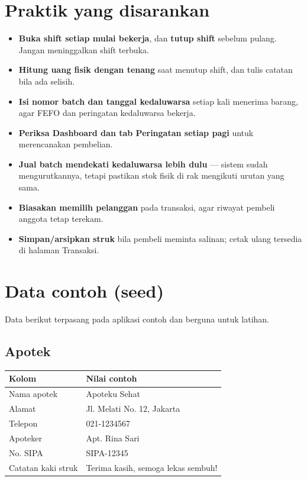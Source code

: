 \documentclass[11pt,a4paper]{article}
\begin{document}
\section{Praktik yang disarankan}

\begin{itemize}[leftmargin=1.4em,itemsep=0.45em]
  \item \textbf{Buka shift setiap mulai bekerja}, dan \textbf{tutup shift}
        sebelum pulang. Jangan meninggalkan shift terbuka.
  \item \textbf{Hitung uang fisik dengan tenang} saat menutup shift, dan tulis
        catatan bila ada selisih.
  \item \textbf{Isi nomor batch dan tanggal kedaluwarsa} setiap kali menerima
        barang, agar FEFO dan peringatan kedaluwarsa bekerja.
  \item \textbf{Periksa Dashboard dan tab Peringatan setiap pagi} untuk
        merencanakan pembelian.
  \item \textbf{Jual batch mendekati kedaluwarsa lebih dulu} --- sistem sudah
        mengurutkannya, tetapi pastikan stok fisik di rak mengikuti urutan yang
        sama.
  \item \textbf{Biasakan memilih pelanggan} pada transaksi, agar riwayat pembeli
        anggota tetap terekam.
  \item \textbf{Simpan/arsipkan struk} bila pembeli meminta salinan; cetak ulang
        tersedia di halaman Transaksi.
\end{itemize}

\appendix
\section{Data contoh (seed)}

Data berikut terpasang pada aplikasi contoh dan berguna untuk latihan.

\subsection{Apotek}
\begin{tabularx}{\textwidth}{@{}L{4.6cm}Y@{}}
  \toprule
  \textbf{Kolom} & \textbf{Nilai contoh} \\
  \midrule
  Nama apotek & Apoteku Sehat \\
  Alamat      & Jl. Melati No. 12, Jakarta \\
  Telepon     & 021-1234567 \\
  Apoteker    & Apt. Rina Sari \\
  No. SIPA    & SIPA-12345 \\
  Catatan kaki struk & Terima kasih, semoga lekas sembuh! \\
  \bottomrule
\end{tabularx}
\end{document}
